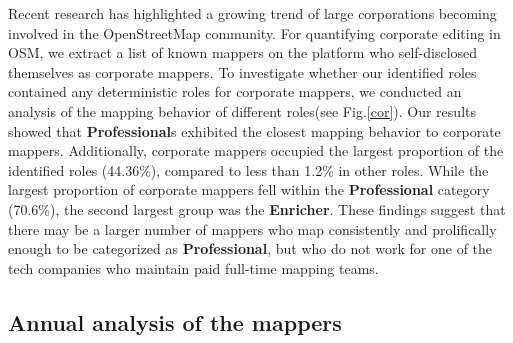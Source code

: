 \documentclass[manuscript,screen,review]{acmart}
\begin{document}
Recent research has highlighted a growing trend of large corporations becoming involved in the OpenStreetMap community. For quantifying corporate editing in OSM, we extract a list of known mappers on the platform who self-disclosed themselves as corporate mappers.\cite{Veselovsky22} To investigate whether our identified roles contained any deterministic roles for corporate mappers, we conducted an analysis of the mapping behavior of different roles(see Fig.\ref{cor}). Our results showed that \textbf{Professional}s exhibited the closest mapping behavior to corporate mappers. Additionally, corporate mappers occupied the largest proportion of the identified roles (44.36\%), compared to less than 1.2\% in other roles. While the largest proportion of corporate mappers fell within the \textbf{Professional} category (70.6\%), the second largest group was the \textbf{Enricher}. These findings suggest that there may be a larger number of mappers who map consistently and prolifically enough to be categorized as \textbf{Professional}, but who do not work for one of the tech companies who maintain paid full-time mapping teams.

\subsection{Annual analysis of the mappers}

\label{Annual_evolution}
\end{document}
